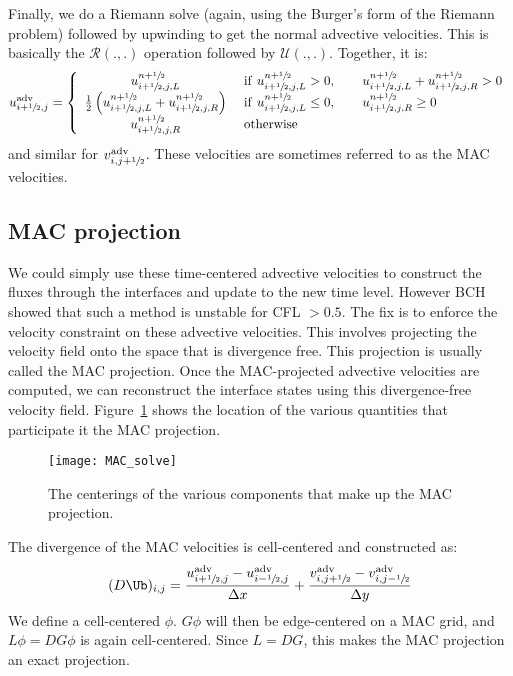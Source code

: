 Finally, we do a Riemann solve (again, using the Burger's form of the
Riemann problem) followed by upwinding to get the normal advective
velocities.  This is basically the $\mathcal{R}(.,.)$ operation followed
by $\mathcal{U}(.,.)$.  Together, it is:
\begin{equation}
u^\mathrm{adv}_{i+{\sfrac{1}{2}},j} = \left \{ \begin{array}{cl}
   u_{i+{\sfrac{1}{2}},j,L}^{n+{\sfrac{1}{2}}}  &
         \mathrm{~if~} u_{i+{\sfrac{1}{2}},j,L}^{n+{\sfrac{1}{2}}} > 0, \qquad
                       u_{i+{\sfrac{1}{2}},j,L}^{n+{\sfrac{1}{2}}} + u_{i+{\sfrac{1}{2}},j,R}^{n+{\sfrac{1}{2}}} > 0 \\
   \frac{1}{2} \left ( u_{i+{\sfrac{1}{2}},j,L}^{n+{\sfrac{1}{2}}} +
                       u_{i+{\sfrac{1}{2}},j,R}^{n+{\sfrac{1}{2}}} \right )  &
          \mathrm{~if~} u_{i+{\sfrac{1}{2}},j,L}^{n+{\sfrac{1}{2}}} \le 0, \qquad
                        u_{i+{\sfrac{1}{2}},j,R}^{n+{\sfrac{1}{2}}} \ge 0 \\
   u_{i+{\sfrac{1}{2}},j,R}^{n+{\sfrac{1}{2}}}  & \mathrm{~otherwise}
  \end{array}
  \right .
\end{equation}
and similar for $v^\mathrm{adv}_{i,j+{\sfrac{1}{2}}}$.
These velocities are sometimes referred to as the MAC velocities.


\subsection{MAC projection}

We could simply use these time-centered advective velocities to
construct the fluxes through the interfaces and update to the new time
level.  However BCH showed that such a method is unstable for CFL $>
0.5$.  The fix is to enforce the velocity constraint on these advective
velocities.  This involves projecting the velocity field onto the
space that is divergence free.  This projection is usually called the
MAC projection.  Once the MAC-projected advective velocities are
computed, we can reconstruct the interface states using this
divergence-free velocity field.  Figure~\ref{fig:incomp:MACsolve}
shows the location of the various quantities that participate
it the MAC projection.

\begin{figure}[t]
\centering
\texttt{[image: MAC\_solve]}
\caption[MAC grid data centerings] {\label{fig:incomp:MACsolve} The
  centerings of the various components that make up the MAC
  projection.}
\end{figure}

The divergence of the MAC velocities is cell-centered and constructed as:
\begin{equation}
(D \Ub)_{i,j} = \frac{u^\mathrm{adv}_{i+\myhalf,j} - u^\mathrm{adv}_{i-\myhalf,j}}
                   {\Delta x} +
              \frac{v^\mathrm{adv}_{i,j+\myhalf} - v^\mathrm{adv}_{i,j-\myhalf}}
                   {\Delta y}
\end{equation}
We define a cell-centered $\phi$.  $G\phi$ will then be edge-centered
on a MAC grid, and $L\phi = DG\phi$ is again cell-centered.  Since $L =
DG$, this makes the MAC projection an exact projection.

